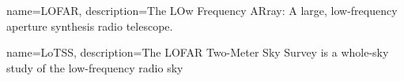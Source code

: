 
\makeglossaries

{
    name=LOFAR,
    description={The LOw Frequency ARray: A large, low-frequency aperture synthesis radio telescope.} 
}

{
    name=LoTSS,
    description={The LOFAR Two-Meter Sky Survey is a whole-sky study of the low-frequency radio sky}
}


